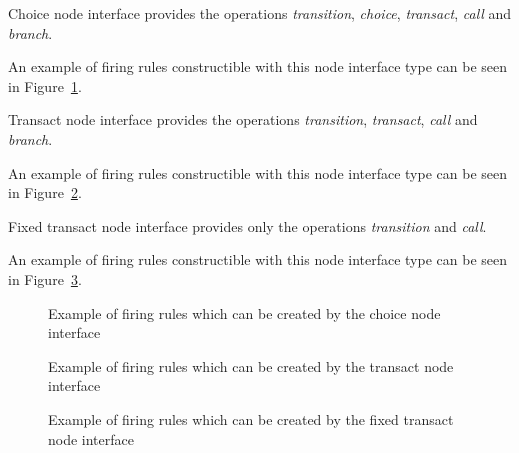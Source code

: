 \begin{definition}\label{choice-node-interface-type}
Choice node interface provides the operations
\emph{transition}, \emph{choice}, \emph{transact}, \emph{call} and \emph{branch}.
\end{definition}

An example of firing rules constructible with this node interface
type can be seen in Figure~\ref{fig:firing-rules-choice}.

\begin{definition}\label{transact-node-interface-type}
Transact node interface provides the operations
\emph{transition}, \emph{transact}, \emph{call} and \emph{branch}.
\end{definition}

An example of firing rules constructible with this node interface
type can be seen in Figure~\ref{fig:firing-rules-transact}.

\begin{definition}\label{fixed-transact-node-interface-type}
Fixed transact node interface provides only the operations
\emph{transition} and \emph{call}.
\end{definition}

An example of firing rules constructible with this node interface
type can be seen in Figure~\ref{fig:firing-rules-fixed-transact}.

\begin{figure}
\centering

\caption{Example of firing rules which can be created by the choice node interface}
\label{fig:firing-rules-choice}
\end{figure}

\begin{figure}
\centering

\caption{Example of firing rules which can be created by the transact node interface}
\label{fig:firing-rules-transact}
\end{figure}

\begin{figure}
\centering

\caption{Example of firing rules which can be created by the fixed transact node interface}
\label{fig:firing-rules-fixed-transact}
\end{figure}


